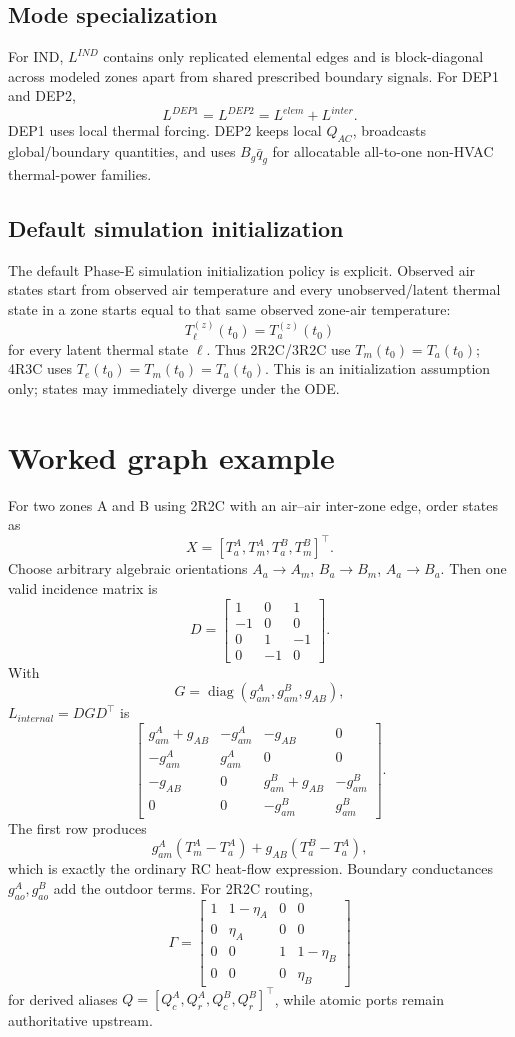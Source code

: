 \documentclass[11pt]{article}
\newcommand{\diag}{\operatorname{diag}}
\begin{document}
\subsection{Mode specialization}
For IND, $L^{IND}$ contains only replicated elemental edges and is block-diagonal across modeled zones apart from shared prescribed boundary signals. For DEP1 and DEP2,
\[
L^{DEP1}=L^{DEP2}=L^{elem}+L^{inter}.
\]
DEP1 uses local thermal forcing. DEP2 keeps local $Q_{AC}$, broadcasts global/boundary quantities, and uses $B_g\bar q_g$ for allocatable all-to-one non-HVAC thermal-power families.

\subsection{Default simulation initialization}
The default Phase-E simulation initialization policy is explicit. Observed air states start from observed air temperature and every unobserved/latent thermal state in a zone starts equal to that same observed zone-air temperature:
\[
\boxed{T_\ell^{(z)}(t_0)=T_a^{(z)}(t_0)}
\]
for every latent thermal state $\ell$. Thus 2R2C/3R2C use $T_m(t_0)=T_a(t_0)$; 4R3C uses $T_e(t_0)=T_m(t_0)=T_a(t_0)$. This is an initialization assumption only; states may immediately diverge under the ODE.

\section{Worked graph example}
For two zones A and B using 2R2C with an air--air inter-zone edge, order states as
\[
X=[T_a^A,T_m^A,T_a^B,T_m^B]^\top.
\]
Choose arbitrary algebraic orientations $A_a\to A_m$, $B_a\to B_m$, $A_a\to B_a$. Then one valid incidence matrix is
\[
D=\begin{bmatrix}
1&0&1\\
-1&0&0\\
0&1&-1\\
0&-1&0
\end{bmatrix}.
\]
With
\[
G=\diag(g_{am}^A,g_{am}^B,g_{AB}),
\]
$L_{internal}=DGD^\top$ is
\[
\begin{bmatrix}
g_{am}^A+g_{AB}&-g_{am}^A&-g_{AB}&0\\
-g_{am}^A&g_{am}^A&0&0\\
-g_{AB}&0&g_{am}^B+g_{AB}&-g_{am}^B\\
0&0&-g_{am}^B&g_{am}^B
\end{bmatrix}.
\]
The first row produces
\[
g_{am}^A(T_m^A-T_a^A)+g_{AB}(T_a^B-T_a^A),
\]
which is exactly the ordinary RC heat-flow expression. Boundary conductances $g_{ao}^A,g_{ao}^B$ add the outdoor terms. For 2R2C routing,
\[
\Gamma=\begin{bmatrix}
1&1-\eta_A&0&0\\
0&\eta_A&0&0\\
0&0&1&1-\eta_B\\
0&0&0&\eta_B
\end{bmatrix}
\]
for derived aliases $Q=[Q_c^A,Q_r^A,Q_c^B,Q_r^B]^\top$, while atomic ports remain authoritative upstream.
\end{document}
